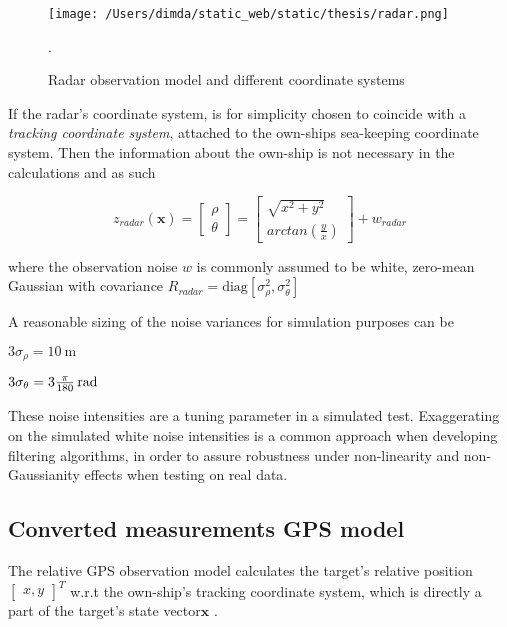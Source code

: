 \begin{figure}[H]
	\centering
	\texttt{[image: /Users/dimda/static\_web/static/thesis/radar.png]}
	\caption{Radar observation model and different coordinate systems}.
	\label{fig:radar_observation_model}
\end{figure}


If the radar's coordinate system, is for simplicity  chosen to coincide with a \emph{tracking coordinate system},  attached to the own-ships sea-keeping coordinate system. Then the information about the own-ship is not necessary in the calculations and as such

\begin{equation}
z_{radar}(\mathbf{x}) = \begin{bmatrix}
\rho \\
\theta
\end{bmatrix} = \begin{bmatrix}
\sqrt{x^2 + y^2} \\
arctan(\frac{y}{x})
\end{bmatrix} + w_{radar}
\end{equation}


where the observation noise $w$ is commonly assumed to be white, zero-mean Gaussian with covariance $R_{radar} = \text{diag}\left[\sigma^2_{\rho}, \sigma^2_{\theta}\right] $



A reasonable sizing of the noise variances for simulation purposes can be
\begin{description}
	\item $3\sigma_\rho = \SI{10}{\meter}$
	\item $3\sigma_\theta = \SI[parse-numbers=false]{3\frac{\pi}{180}}{\radian}  $
\end{description}

These noise intensities are a tuning parameter in a simulated test. Exaggerating on the simulated white noise intensities is a common approach when developing filtering algorithms, in order to assure robustness under non-linearity and non-Gaussianity effects when testing on real data.

\subsection{Converted measurements GPS model}


The relative GPS observation model calculates the target's relative position $\begin{bmatrix}x, y\end{bmatrix}^{T} $ w.r.t the own-ship's tracking coordinate system, which is directly a part of the target's state vector$\mathbf{x}$
. 

